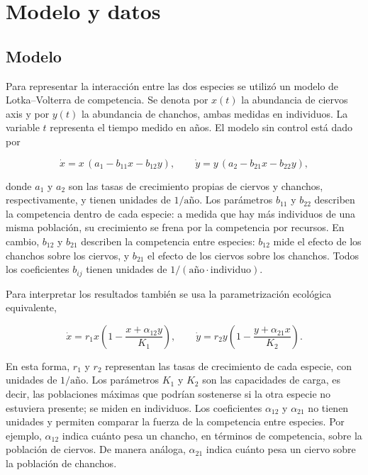 \documentclass[11pt,a4paper]{article}
\newif\ifguias
\newcommand{\guia}[1]{\ifguias\par\noindent
  {\color{gray!85!black}\small\itshape #1}\par\medskip\fi}
\begin{document}
\section{Modelo y datos}
\label{sec:modelo}

\subsection{Modelo}

Para representar la interacción entre las dos especies se utilizó un modelo de Lotka--Volterra de competencia. Se denota por $x(t)$ la abundancia de ciervos axis y por $y(t)$ la abundancia de chanchos, ambas medidas en individuos. La variable $t$ representa el tiempo medido en años. El modelo sin control está dado por

\begin{equation}
\label{eq:modelo}
\dot x = x\,(a_1 - b_{11}x - b_{12}y), \qquad
\dot y = y\,(a_2 - b_{21}x - b_{22}y),
\end{equation}

donde $a_1$ y $a_2$ son las tasas de crecimiento propias de ciervos y chanchos, respectivamente, y tienen unidades de $1/\text{año}$. Los parámetros $b_{11}$ y $b_{22}$ describen la competencia dentro de cada especie: a medida que hay más individuos de una misma población, su crecimiento se frena por la competencia por recursos. En cambio, $b_{12}$ y $b_{21}$ describen la competencia entre especies: $b_{12}$ mide el efecto de los chanchos sobre los ciervos, y $b_{21}$ el efecto de los ciervos sobre los chanchos. Todos los coeficientes $b_{ij}$ tienen unidades de $1/(\text{año}\cdot\text{individuo})$.

Para interpretar los resultados también se usa la parametrización ecológica equivalente,

\begin{equation}
\label{eq:modelo-ecologico}
\dot x = r_1 x \left(1 - \frac{x + \alpha_{12}y}{K_1}\right), \qquad
\dot y = r_2 y \left(1 - \frac{y + \alpha_{21}x}{K_2}\right).
\end{equation}

En esta forma, $r_1$ y $r_2$ representan las tasas de crecimiento de cada especie, con unidades de $1/\text{año}$. Los parámetros $K_1$ y $K_2$ son las capacidades de carga, es decir, las poblaciones máximas que podrían sostenerse si la otra especie no estuviera presente; se miden en individuos. Los coeficientes $\alpha_{12}$ y $\alpha_{21}$ no tienen unidades y permiten comparar la fuerza de la competencia entre especies. Por ejemplo, $\alpha_{12}$ indica cuánto pesa un chancho, en términos de competencia, sobre la población de ciervos. De manera análoga, $\alpha_{21}$ indica cuánto pesa un ciervo sobre la población de chanchos.
\end{document}
